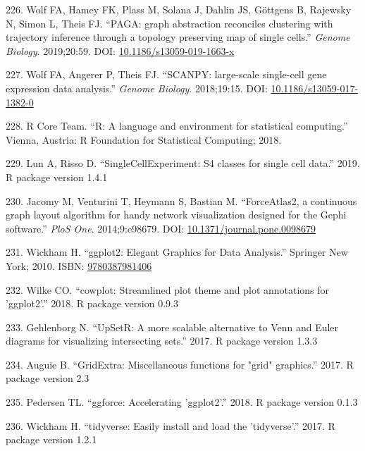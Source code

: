 \documentclass[11pt,a4paper,titlepage,twoside,openright]{style/unimelbthesis}
\theoremstyle{definition}
\theoremstyle{definition}
\theoremstyle{definition}
\theoremstyle{remark}
\begin{document}
\begin{mainmatter}
\leavevmode\hypertarget{ref-Wolf2019-fo}{}%
226. Wolf FA, Hamey FK, Plass M, Solana J, Dahlin JS, Göttgens B, Rajewsky N, Simon L, Theis FJ. ``PAGA: graph abstraction reconciles clustering with trajectory inference through a topology preserving map of single cells.'' \emph{Genome Biology}. 2019;20:59. DOI: \href{https://doi.org/10.1186/s13059-019-1663-x}{10.1186/s13059-019-1663-x}

\leavevmode\hypertarget{ref-Wolf2018-na}{}%
227. Wolf FA, Angerer P, Theis FJ. ``SCANPY: large-scale single-cell gene expression data analysis.'' \emph{Genome Biology}. 2018;19:15. DOI: \href{https://doi.org/10.1186/s13059-017-1382-0}{10.1186/s13059-017-1382-0}

\leavevmode\hypertarget{ref-R-base}{}%
228. R Core Team. ``R: A language and environment for statistical computing.'' Vienna, Austria: R Foundation for Statistical Computing; 2018.

\leavevmode\hypertarget{ref-R-SingleCellExperiment}{}%
229. Lun A, Risso D. ``SingleCellExperiment: S4 classes for single cell data.'' 2019. R package version 1.4.1

\leavevmode\hypertarget{ref-Jacomy2014-um}{}%
230. Jacomy M, Venturini T, Heymann S, Bastian M. ``ForceAtlas2, a continuous graph layout algorithm for handy network visualization designed for the Gephi software.'' \emph{PloS One}. 2014;9:e98679. DOI: \href{https://doi.org/10.1371/journal.pone.0098679}{10.1371/journal.pone.0098679}

\leavevmode\hypertarget{ref-Wickham2010-zq}{}%
231. Wickham H. ``ggplot2: Elegant Graphics for Data Analysis.'' Springer New York; 2010. ISBN: \href{https://worldcat.org/isbn/9780387981406}{9780387981406}

\leavevmode\hypertarget{ref-R-cowplot}{}%
232. Wilke CO. ``cowplot: Streamlined plot theme and plot annotations for 'ggplot2'.'' 2018. R package version 0.9.3

\leavevmode\hypertarget{ref-R-UpSetR}{}%
233. Gehlenborg N. ``UpSetR: A more scalable alternative to Venn and Euler diagrams for visualizing intersecting sets.'' 2017. R package version 1.3.3

\leavevmode\hypertarget{ref-R-gridExtra}{}%
234. Auguie B. ``GridExtra: Miscellaneous functions for "grid" graphics.'' 2017. R package version 2.3

\leavevmode\hypertarget{ref-R-ggforce}{}%
235. Pedersen TL. ``ggforce: Accelerating 'ggplot2'.'' 2018. R package version 0.1.3

\leavevmode\hypertarget{ref-R-tidyverse}{}%
236. Wickham H. ``tidyverse: Easily install and load the 'tidyverse'.'' 2017. R package version 1.2.1


\end{mainmatter}
\end{document}

